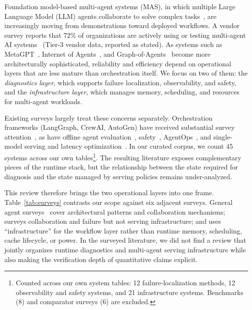 Foundation model-based multi-agent systems (MAS), in which multiple Large Language Model (LLM) agents collaborate to solve complex tasks~\cite{metagpt2024, camel2023, chatdev2024}, are increasingly moving from demonstrations toward deployed workflows. A vendor survey reports that 72\% of organizations are actively using or testing multi-agent AI systems~\cite{zapier2025} (Tier-3 vendor data, reported as stated). As systems such as MetaGPT~\cite{metagpt2024}, Internet of Agents~\cite{ioa2025}, and Graph-of-Agents~\cite{graphofagents2026} become more architecturally sophisticated, reliability and efficiency depend on operational layers that are less mature than orchestration itself. We focus on two of them: the \emph{diagnostics layer}, which supports failure localization, observability, and safety, and the \emph{infrastructure layer}, which manages memory, scheduling, and resources for multi-agent workloads.

Existing surveys largely treat these concerns separately. Orchestration frameworks (LangGraph, CrewAI, AutoGen) have received substantial survey attention~\cite{zhu2026orchestration}, as have offline agent evaluation~\cite{evalbenchmark2025, evalagents2026, llmbenchsurvey2025}, safety~\cite{safellmagentsurvey2026, trustworthyagents2025}, AgentOps~\cite{agentopssurvey2025, agentopscsiro2024, architectingops2026}, and single-model serving and latency optimization~\cite{latencysurvey2026}. In our curated corpus, we count 45 systems across our own tables\footnote{Counted across our own system tables: 12 failure-localization methods, 12 observability and safety systems, and 21 infrastructure systems. Benchmarks (8) and comparator surveys (6) are excluded.}. The resulting literature exposes complementary pieces of the runtime stack, but the relationship between the state required for diagnosis and the state managed by serving policies remains under-analyzed.

This review therefore brings the two operational layers into one frame. Table~\ref{tab:surveys} contrasts our scope against six adjacent surveys. General agent surveys~\cite{li2024, abouali2025, wang2026classical, tran2025} cover architectural patterns and collaboration mechanisms; \cite{beyondindiv2026} surveys collaboration and failure but not serving infrastructure; and \cite{li2024} uses ``infrastructure'' for the workflow layer rather than runtime memory, scheduling, cache lifecycle, or power. In the surveyed literature, we did not find a review that jointly organizes runtime diagnostics and multi-agent serving infrastructure while also making the verification depth of quantitative claims explicit.

